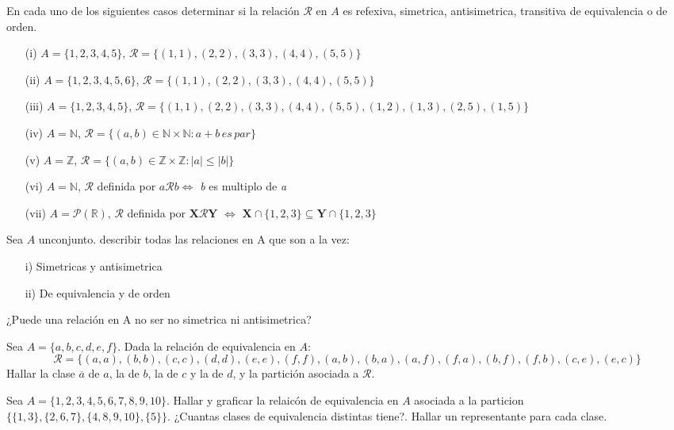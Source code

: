 \documentclass[10pt]{article}
\begin{document}
\begin{ej}
En cada uno de los siguientes casos determinar si la relación $\mathcal{R}$ en $A$ es refexiva, simetrica, antisimetrica, transitiva de equivalencia o de orden.
	\begin{itemize}
		\item[(i)] $A =\{ 1,2,3,4,5\}$, $\mathcal{R} = \{ (1,1), (2,2), (3,3), (4, 4), (5, 5)\}$
		\item[(ii)] $A =\{ 1,2,3,4,5,6 \}$, $\mathcal{R} = \{ (1,1), (2,2), (3,3), (4, 4), (5, 5)\}$
		\item[(iii)] $A =\{ 1,2,3,4,5\}$, $\mathcal{R} = \{ (1,1), (2,2), (3,3), (4, 4), (5, 5), (1,2), (1,3), (2,5), (1,5)\}$
		\item[(iv)]$A = \mathbb{N}$, $\mathcal{R} = \{(a,b) \in \mathbb{N} \times \mathbb{N} :  a + b \, es \,  par \}$
		\item[(v)] $A = \mathbb{Z}$, $\mathcal{R} = \{(a,b) \in \mathbb{Z} \times \mathbb{Z} :  |a| \leq |b|  \}$
		\item[(vi)] $A = \mathbb{N}$, $\mathcal{R}$ definida por $a \mathcal{R} b \Leftrightarrow$ \textit{b} es multiplo de \textit{a}
		\item[(vii)] $A = \mathcal{P}(\mathbb{R})$, $\mathcal{R} $ definida por $\textbf{X} \mathcal{R} \textbf{Y}$ $\Leftrightarrow$ $\textbf{X} \cap \{1,2,3\} \subseteq \textbf{Y} \cap \{1,2,3\}$
	\end{itemize}
\end{ej}

\begin{ej}
 Sea $A$ unconjunto. describir todas las relaciones en A que son a la vez:
 \begin{itemize}
 		\item[i)] Simetricas y antisimetrica
 		\item[ii)] De equivalencia y de orden
 \end{itemize}
 ¿Puede una relación en A no ser no simetrica ni antisimetrica?
\end{ej}

\begin{ej}
Sea $A = \{ a,b,c,d,e,f \}$.  Dada la relación de equivalencia en $A$:
$$ \mathcal{R} = \{ (a,a), (b,b), (c,c), (d,d), (e,e), (f,f), (a,b), (b,a), (a, f), (f, a), (b, f), (f, b),(c, e),(e, c) \}$$
Hallar la clase $\overline{a}$ de $a$, la de $b$, la de $c$ y la de $d$, y la partición asociada a $\mathcal{R}.$
\end{ej}

\begin{ej}
Sea $A = \{ 1,2,3,4,5,6,7,8,9,10 \}$. Hallar y graficar la relaicón de equivalencia en $A$ asociada a la particion $\{ \{1,3\}, \{2,6,7\}, \{4,8,9,10\}, \{5\}   \}$. ¿Cuantas clases de equivalencia distintas tiene?. Hallar un representante para cada clase. 
\end{ej}
\end{document}
